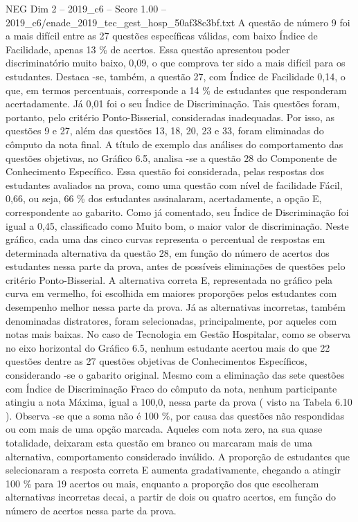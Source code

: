 \begin{textsample}{NEG Dim 2 – 2019\_c6 – Score 1.00 – 2019\_c6/enade\_2019\_tec\_gest\_hosp\_50af38c3bf.txt}
A questão de número 9 foi a mais difícil entre as 27 questões específicas válidas, com baixo Índice de Facilidade, apenas 13 \% de acertos.
Essa questão apresentou poder discriminatório muito baixo, 0,09, o que comprova ter sido a mais difícil para os estudantes.
Destaca -se, também, a questão 27, com Índice de Facilidade 0,14, o que, em termos percentuais, corresponde a 14 \% de estudantes que responderam acertadamente.
Já 0,01 foi o seu Índice de Discriminação.
Tais questões foram, portanto, pelo critério Ponto-Bisserial, consideradas inadequadas.
Por isso, as questões 9 e 27, além das questões 13, 18, 20, 23 e 33, foram eliminadas do cômputo da nota final.
A título de exemplo das análises do comportamento das questões objetivas, no Gráfico 6.5, analisa -se a questão 28 do Componente de Conhecimento Específico.
Essa questão foi considerada, pelas respostas dos estudantes avaliados na prova, como uma questão com nível de facilidade Fácil, 0,66, ou seja, 66 \% dos estudantes assinalaram, acertadamente, a opção E, correspondente ao gabarito.
Como já comentado, seu Índice de Discriminação foi igual a 0,45, classificado como Muito bom, o maior valor de discriminação.
Neste gráfico, cada uma das cinco curvas representa o percentual de respostas em determinada alternativa da questão 28, em função do número de acertos dos estudantes nessa parte da prova, antes de possíveis eliminações de questões pelo critério Ponto-Bisserial.
A alternativa correta E, representada no gráfico pela curva em vermelho, foi escolhida em maiores proporções pelos estudantes com desempenho melhor nessa parte da prova.
Já as alternativas incorretas, também denominadas distratores, foram selecionadas, principalmente, por aqueles com notas mais baixas.
No caso de Tecnologia em Gestão Hospitalar, como se observa no eixo horizontal do Gráfico 6.5, nenhum estudante acertou mais do que 22 questões dentre as 27 questões objetivas de Conhecimentos Específicos, considerando -se o gabarito original.
Mesmo com a eliminação das sete questões com Índice de Discriminação Fraco do cômputo da nota, nenhum participante atingiu a nota Máxima, igual a 100,0, nessa parte da prova ( visto na Tabela 6.10 ).
Observa -se que a soma não é 100 \%, por causa das questões não respondidas ou com mais de uma opção marcada.
Aqueles com nota zero, na sua quase totalidade, deixaram esta questão em branco ou marcaram mais de uma alternativa, comportamento considerado inválido.
A proporção de estudantes que selecionaram a resposta correta E aumenta gradativamente, chegando a atingir 100 \% para 19 acertos ou mais, enquanto a proporção dos que escolheram alternativas incorretas decai, a partir de dois ou quatro acertos, em função do número de acertos nessa parte da prova.

\end{textsample}

